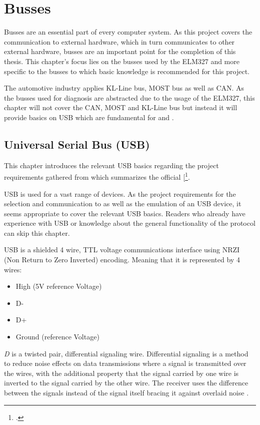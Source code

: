 \setcounter{section}{0}
\section{Busses}

Busses are an essential part of every computer system. As this project covers the communication to external hardware, which in turn communicates to other 
external hardware, busses are an important point for the completion of this thesis. This chapter’s focus lies on the busses used by the ELM327 and more 
specific to the busses to which basic knowledge is recommended for this project.

The automotive industry applies KL-Line bus, MOST bus as well as CAN. As the busses used for diagnosis are abstracted due to the usage of the ELM327, 
this chapter will not cover the CAN, MOST and KL-Line bus but instead it will provide basics on USB which are fundamental for  
and .

\subsection{Universal Serial Bus (USB)}

This chapter introduces the relevant USB basics regarding the project requirements gathered from \cite{USBNUT} which summarizes the official  
[\footcite[pp. 36ff., 199ff., 260-274]{USB}.

USB is used for a vast range of devices. As the project requirements for the selection and communication to as well as the emulation of an USB device,
it seems appropriate to cover the relevant USB basics. Readers who already have experience with USB or knowledge about the general functionality of the 
protocol can skip this chapter.

USB is a shielded 4 wire, TTL voltage communications interface using NRZI (Non Return to Zero Inverted) encoding. Meaning that it is represented by 4 wires:

\begin{itemize}
\item High (5V reference Voltage)
\item D-
\item D+
\item Ground (reference Voltage)
\end{itemize}

\emph{D} is a twisted pair, differential signaling wire. Differential signaling is a method to reduce noise effects on data transmissions where a signal
is transmitted over the wires, with the additional property that the signal carried by one wire is inverted to the signal carried by the other wire. The 
receiver uses the difference between the signals instead of the signal itself bracing it against overlaid noise \cite{Massoud2001}.

